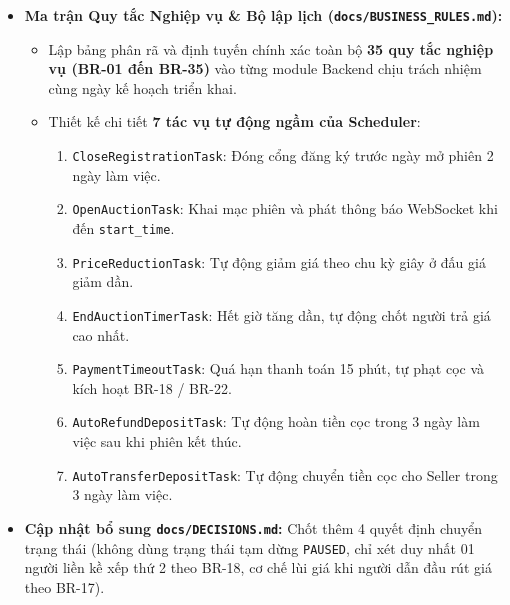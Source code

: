 \documentclass[a4paper]{article}
\begin{document}
\begin{itemize}
    \item \textbf{Ma trận Quy tắc Nghiệp vụ \& Bộ lập lịch (\texttt{docs/BUSINESS\_RULES.md}):}
    \begin{itemize}
        \item Lập bảng phân rã và định tuyến chính xác toàn bộ \textbf{35 quy tắc nghiệp vụ (BR-01 đến BR-35)} vào từng module Backend chịu trách nhiệm cùng ngày kế hoạch triển khai.
        \item Thiết kế chi tiết \textbf{7 tác vụ tự động ngầm của Scheduler}:
        \begin{enumerate}
            \item \texttt{CloseRegistrationTask}: Đóng cổng đăng ký trước ngày mở phiên 2 ngày làm việc.
            \item \texttt{OpenAuctionTask}: Khai mạc phiên và phát thông báo WebSocket khi đến \texttt{start\_time}.
            \item \texttt{PriceReductionTask}: Tự động giảm giá theo chu kỳ giây ở đấu giá giảm dần.
            \item \texttt{EndAuctionTimerTask}: Hết giờ tăng dần, tự động chốt người trả giá cao nhất.
            \item \texttt{PaymentTimeoutTask}: Quá hạn thanh toán 15 phút, tự phạt cọc và kích hoạt BR-18 / BR-22.
            \item \texttt{AutoRefundDepositTask}: Tự động hoàn tiền cọc trong 3 ngày làm việc sau khi phiên kết thúc.
            \item \texttt{AutoTransferDepositTask}: Tự động chuyển tiền cọc cho Seller trong 3 ngày làm việc.
        \end{enumerate}
    \end{itemize}
    
    \item \textbf{Cập nhật bổ sung \texttt{docs/DECISIONS.md}:} Chốt thêm 4 quyết định chuyển trạng thái (không dùng trạng thái tạm dừng \texttt{PAUSED}, chỉ xét duy nhất 01 người liền kề xếp thứ 2 theo BR-18, cơ chế lùi giá khi người dẫn đầu rút giá theo BR-17).
\end{itemize}
\end{document}
